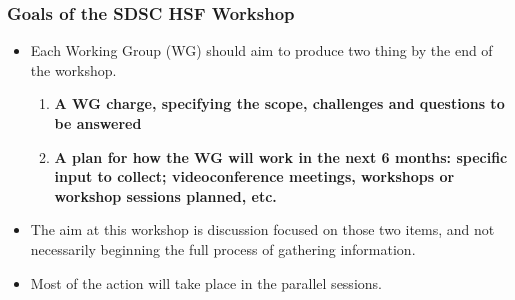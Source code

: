 \begin{frame}
\frametitle{Goals of the SDSC HSF Workshop}

\begin{itemize}
\item Each Working Group (WG) should aim to produce two thing by the end of the workshop.
  \begin{enumerate}
  \item \textbf{A WG charge, specifying the scope, challenges and questions to be answered}
  \item \textbf{A plan for how the WG will work in the next 6 months: specific input to collect; videoconference meetings, workshops or workshop sessions planned, etc.}
  \end{enumerate}
\item The aim at this workshop is discussion focused on those two items, and not necessarily beginning the full process of gathering information.
\item Most of the action will take place in the parallel sessions.
\end{itemize}

\end{frame}


